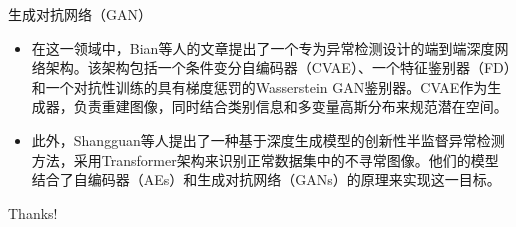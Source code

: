 \documentclass[UTF8]{beamer}
\begin{document}
\begin{frame}{生成对抗网络（GAN）}
    \small
    \begin{itemize}
        \item 在这一领域中，Bian等人的文章提出了一个专为异常检测设计的端到端深度网络架构。该架构包括一个条件变分自编码器（CVAE）、一个特征鉴别器（FD）和一个对抗性训练的具有梯度惩罚的Wasserstein GAN鉴别器。CVAE作为生成器，负责重建图像，同时结合类别信息和多变量高斯分布来规范潜在空间。
        \item 此外，Shangguan等人提出了一种基于深度生成模型的创新性半监督异常检测方法，采用Transformer架构来识别正常数据集中的不寻常图像。他们的模型结合了自编码器（AEs）和生成对抗网络（GANs）的原理来实现这一目标。
    \end{itemize}
\end{frame}

\begin{frame}
    \begin{center}
        {\Huge\calligra Thanks!}
    \end{center}
\end{frame}
\end{document}
